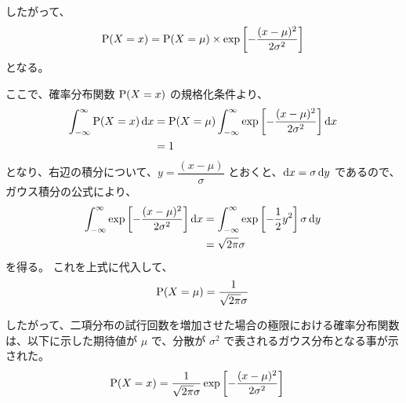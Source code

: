 \documentclass[a4paper,11pt]{ltjsarticle}
\begin{document}
\begin{appendix}
したがって、
\begin{equation}
{\rm P}(X=x) = {\rm P}(X=\mu) \times \exp \left[-\dfrac{(x-\mu)^2}{2 \sigma^2} \right]
\end{equation}
となる。

ここで、確率分布関数 ${\rm P}(X=x)$ の規格化条件より、
\begin{align}
\int_{-\infty}^{\infty} {\rm P}(X=x) \odif{x} 
	&= {\rm P}(X=\mu) \int_{-\infty}^{\infty} \exp \left[-\dfrac{(x-\mu)^2}{2 \sigma^2} \right] \odif{x} \notag \\
	&= 1
\end{align}
となり、右辺の積分について、$y=\dfrac{(x-\mu)}{\sigma}$ とおくと、$\odif{x} = \sigma \odif{y}$ であるので、ガウス積分の公式により、
\begin{align}
\int_{-\infty}^{\infty} \exp \left[-\dfrac{(x-\mu)^2}{2 \sigma^2} \right] \odif{x} 
	&= \int_{-\infty}^{\infty} \exp \left[- \dfrac{1}{2} y^2 \right] \sigma \odif{y} \notag \\
	&= \sqrt{2 \pi} \sigma
\end{align}
を得る。
これを上式に代入して、
\begin{align}
{\rm P}(X=\mu) = \dfrac{1}{\sqrt{2 \pi} \sigma}
\end{align}

したがって、二項分布の試行回数を増加させた場合の極限における確率分布関数は、以下に示した期待値が $\mu$ で、分散が $\sigma^2$ で表されるガウス分布となる事が示された。
\begin{align}
{\rm P}(X=x) 
	&= \dfrac{1}{\sqrt{2 \pi} \sigma} \exp \left[-\dfrac{(x-\mu)^2}{2 \sigma^2} \right]
\end{align}


\end{appendix}
\end{document}
